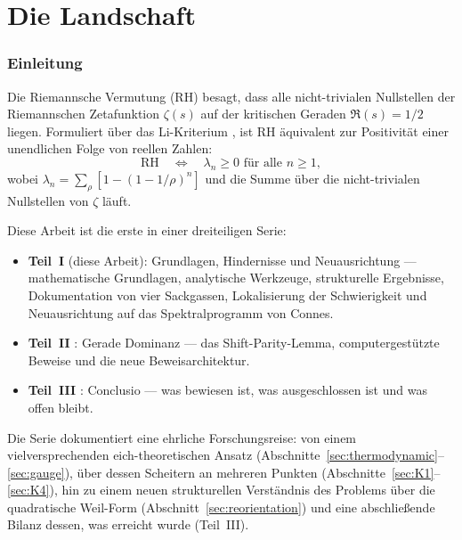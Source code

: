 \documentclass[12pt,a4paper]{article}
\theoremstyle{definition}
\theoremstyle{remark}
\begin{document}
\part*{Die Landschaft}


\section{Einleitung}
\label{sec:intro}

Die Riemannsche Vermutung (RH) besagt, dass alle nicht-trivialen Nullstellen der Riemannschen Zetafunktion $\zeta(s)$ auf der kritischen Geraden $\Re(s) = 1/2$ liegen. Formuliert über das Li-Kriterium \cite{Li1997}, ist RH äquivalent zur Positivität einer unendlichen Folge von reellen Zahlen:
\begin{equation}
\label{eq:li-criterion}
\text{RH} \quad \Longleftrightarrow \quad \lambda_n \geq 0 \text{ für alle } n \geq 1,
\end{equation}
wobei $\lambda_n = \sum_\rho [1 - (1-1/\rho)^n]$ und die Summe über die nicht-trivialen Nullstellen von $\zeta$ läuft.

Diese Arbeit ist die erste in einer dreiteiligen Serie:
\begin{itemize}
  \item \textbf{Teil~I} (diese Arbeit): Grundlagen, Hindernisse und Neuausrichtung --- mathematische Grundlagen, analytische Werkzeuge, strukturelle Ergebnisse, Dokumentation von vier Sackgassen, Lokalisierung der Schwierigkeit und Neuausrichtung auf das Spektralprogramm von Connes.
  \item \textbf{Teil~II} \cite{Geiger2026partII}: Gerade Dominanz --- das Shift-Parity-Lemma, computergestützte Beweise und die neue Beweisarchitektur.
  \item \textbf{Teil~III} \cite{Geiger2026partIII}: Conclusio --- was bewiesen ist, was ausgeschlossen ist und was offen bleibt.
\end{itemize}

Die Serie dokumentiert eine ehrliche Forschungsreise: von einem vielversprechenden eich-theoretischen Ansatz (Abschnitte~\ref{sec:thermodynamic}--\ref{sec:gauge}), über dessen Scheitern an mehreren Punkten (Abschnitte~\ref{sec:K1}--\ref{sec:K4}), hin zu einem neuen strukturellen Verständnis des Problems über die quadratische Weil-Form (Abschnitt~\ref{sec:reorientation}) und eine abschließende Bilanz dessen, was erreicht wurde (Teil~III).
\end{document}
